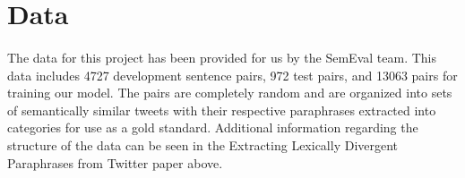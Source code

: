 \documentclass[dvips,12pt]{article}
\begin{document}
\section{Data}
\paragraph{}
The data for this project has been provided for us by the SemEval team. This data includes 4727 development sentence pairs, 972 test pairs, and 13063 pairs for training our model. The pairs are completely random and are organized into sets of semantically similar tweets with their respective paraphrases extracted into categories for use as a gold standard. Additional information regarding the structure of the data can be seen in the Extracting Lexically Divergent Paraphrases from Twitter paper above.




\end{document}

